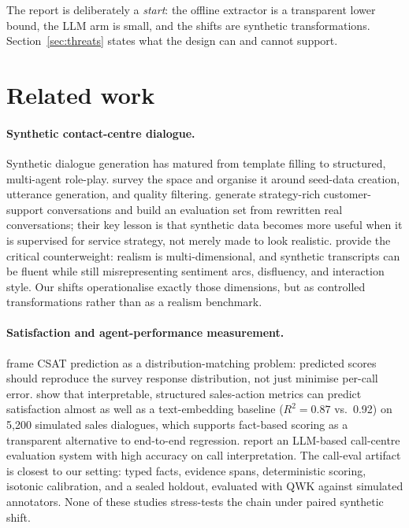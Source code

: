 \documentclass[11pt,a4paper]{article}
\begin{document}
The report is deliberately a \emph{start}: the offline extractor is a transparent lower bound,
the LLM arm is small, and the shifts are synthetic transformations. Section~\ref{sec:threats}
states what the design can and cannot support.

\section{Related work}
\label{sec:related}

\paragraph{Synthetic contact-centre dialogue.}
Synthetic dialogue generation has matured from template filling to structured, multi-agent
role-play. \citet{soudani2026survey} survey the space and organise it around seed-data creation,
utterance generation, and quality filtering. \citet{zhu2026customer} generate strategy-rich
customer-support conversations and build an evaluation set from rewritten real conversations;
their key lesson is that synthetic data becomes more useful when it is supervised for service
strategy, not merely made to look realistic. \citet{devanathan2026mirage} provide the critical
counterweight: realism is multi-dimensional, and synthetic transcripts can be fluent while still
misrepresenting sentiment arcs, disfluency, and interaction style. Our shifts operationalise
exactly those dimensions, but as controlled transformations rather than as a realism benchmark.

\paragraph{Satisfaction and agent-performance measurement.}
\citet{manderscheid2024pcsat} frame CSAT prediction as a distribution-matching problem: predicted
scores should reproduce the survey response distribution, not just minimise per-call error.
\citet{krawczyk2026satisfaction} show that interpretable, structured sales-action metrics can
predict satisfaction almost as well as a text-embedding baseline ($R^2=0.87$ vs.\ 0.92) on 5,200
simulated sales dialogues, which supports fact-based scoring as a transparent alternative to
end-to-end regression. \citet{chincha2025bellteus} report an LLM-based call-centre evaluation
system with high accuracy on call interpretation. The call-eval artifact
\citep{calleval2026,jevlist2026} is closest to our setting: typed facts, evidence spans,
deterministic scoring, isotonic calibration, and a sealed holdout, evaluated with QWK against
simulated annotators. None of these studies stress-tests the chain under paired synthetic shift.
\end{document}
